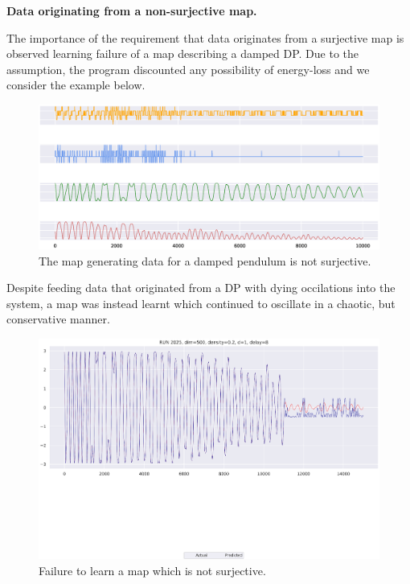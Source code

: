 \documentclass[a4paper,12pt,twoside]{report}
\begin{document}
\textbf{Data originating from a non-surjective map.}

The importance of the requirement that data originates from a surjective map is observed learning failure of a map describing a damped DP.
Due to the assumption, the program discounted any possibility of energy-loss and we consider the example below. 

\begin{figure}[ht]
  \includegraphics[scale=0.4]{_dp_dying.eps}
  \centering
\caption{The map generating data for a damped pendulum is not surjective.}
\label{fig:damped_pendulum}
\end{figure}

Despite feeding data that originated from a DP with dying occilations into the system, a map was instead learnt which continued to oscillate in a chaotic, but conservative manner.

\begin{figure}[ht]
  \includegraphics[scale=0.4]{_dpfailure_nonsurj.eps}
  \centering
\caption{Failure to learn a map which is not surjective.}
\label{fig:dp_notsurjective}
\end{figure}
\end{document}
